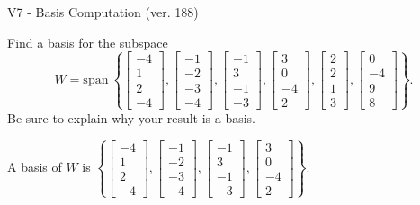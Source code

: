 \begin{exercise}
  \begin{exerciseTitle}V7 - Basis Computation (ver. 188)\end{exerciseTitle}
  \begin{exerciseStatement}
    Find a basis for the subspace 
\[W=\mathrm{span}\ \left\{\left[\begin{array}{r}
-4 \\
1 \\
2 \\
-4
\end{array}\right] , \left[\begin{array}{r}
-1 \\
-2 \\
-3 \\
-4
\end{array}\right] , \left[\begin{array}{r}
-1 \\
3 \\
-1 \\
-3
\end{array}\right] , \left[\begin{array}{r}
3 \\
0 \\
-4 \\
2
\end{array}\right] , \left[\begin{array}{r}
2 \\
2 \\
1 \\
3
\end{array}\right] , \left[\begin{array}{r}
0 \\
-4 \\
9 \\
8
\end{array}\right]\right\}.\]
 Be sure to explain why your result is a basis.


  \end{exerciseStatement}
  \begin{exerciseAnswer}
   A basis of \(W\) is  \(\left\{\left[\begin{array}{r}
-4 \\
1 \\
2 \\
-4
\end{array}\right] , \left[\begin{array}{r}
-1 \\
-2 \\
-3 \\
-4
\end{array}\right] , \left[\begin{array}{r}
-1 \\
3 \\
-1 \\
-3
\end{array}\right] , \left[\begin{array}{r}
3 \\
0 \\
-4 \\
2
\end{array}\right]\right\}\).
  


  \end{exerciseAnswer}
\end{exercise}
